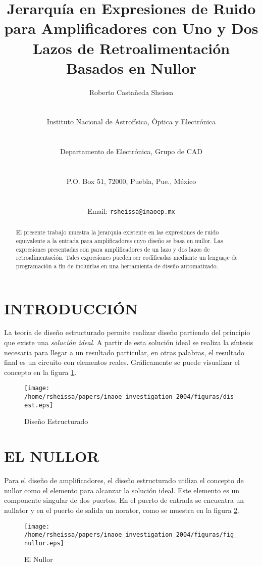 \documentclass[10pt,twocolumn,twoside,letterpaper]{IEEEtran}
\title{Jerarqu\'ia en Expresiones de Ruido para Amplificadores con Uno y Dos Lazos de Retroalimentaci\'on Basados en Nullor}
\author{\begin{Large}{Roberto Casta\~neda Sheissa}\end{Large}\\ \begin{Large}Instituto Nacional de Astrof\'isica, \'Optica y Electr\'onica\end{Large}\\ \begin {Large} Departamento de Electr\'onica, Grupo de CAD\end{Large}\\ \begin{Large}P.O. Box 51, 72000, Puebla, Pue., M\'exico\end{Large}\\ \begin{Large}Email: {\tt rsheissa@inaoep.mx}\end{Large}}
\begin{document}
\pagestyle{empty}
\maketitle

\thispagestyle{empty}
\begin{abstract}
El presente trabajo muestra la jerarqu\'ia existente en las expresiones de ruido equivalente a la entrada para amplificadores cuyo dise\~no se basa en nullor. Las expresiones presentadas son para amplificadores de un lazo y dos lazos de retroalimentaci\'on. Tales expresiones pueden ser codificadas me\-dian\-te un lenguaje de programaci\'on a fin de incluirlas en una herramienta de dise\~no automatizado.
\end{abstract}

{\section{\bf {INTRODUCCI\'ON}}
La teor\'ia de dise\~no estructurado \cite{verhoeven,verhoeven1} permite realizar dise\~no partiendo del principio que existe una {\it soluci\'on ideal}. A partir de esta soluci\'on ideal se realiza la s\'intesis necesaria para llegar a un resultado particular, en otras palabras, el resultado final es un circuito con elementos reales. Gr\'aficamente se puede visualizar el concepto en la figura \ref{fig:dis_est}.

\begin{figure}[hbtp]
   \centering
   \texttt{[image: /home/rsheissa/papers/inaoe\_investigation\_2004/figuras/dis\_est.eps]}
   \caption{Dise\~no Estructurado}
   \label{fig:dis_est}
\end{figure}

\section{\textbf{EL NULLOR}}
Para el dise\~no de amplificadores, el dise\~no estructurado utiliza el concepto de nullor como el elemento para alcanzar la soluci\'on ideal. Este elemento es un componente singular de dos puertos. En el puerto de entrada se encuentra un nullator y en el puerto de salida un norator, como se muestra en la figura \ref{fig:nullor}.

\begin{figure}[hbtp]
   \centering
   \texttt{[image: /home/rsheissa/papers/inaoe\_investigation\_2004/figuras/fig\_nullor.eps]}
   \caption{El Nullor}
   \label{fig:nullor}
\end{figure}

}
\end{document}
